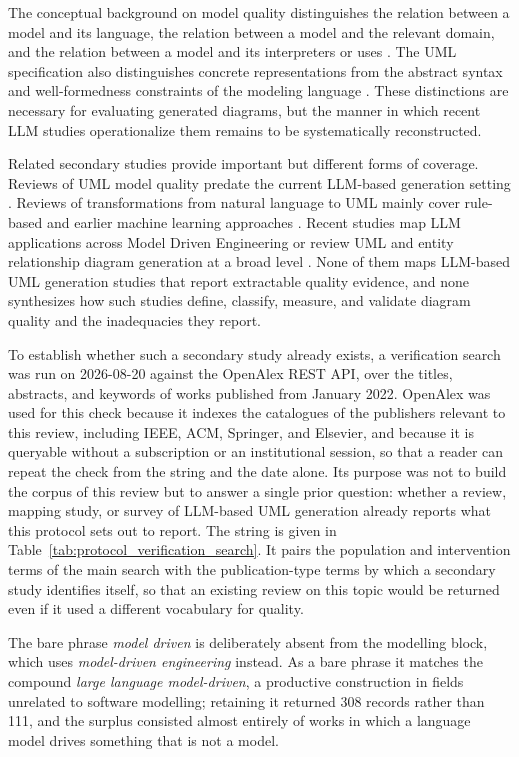 The conceptual background on model quality distinguishes the relation between a model and its language, the relation between a model and the relevant domain, and the relation between a model and its interpreters or uses \cite{Lindland1994Quality,Krogstie2006Process}. The UML specification also distinguishes concrete representations from the abstract syntax and well-formedness constraints of the modeling language \cite{OMG2017UML}. These distinctions are necessary for evaluating generated diagrams, but the manner in which recent LLM studies operationalize them remains to be systematically reconstructed.

Related secondary studies provide important but different forms of coverage. Reviews of UML model quality predate the current LLM-based generation setting \cite{Genero2011UMLQuality}. Reviews of transformations from natural language to UML mainly cover rule-based and earlier machine learning approaches \cite{Ahmed2022NaturalUML}. Recent studies map LLM applications across Model Driven Engineering or review UML and entity relationship diagram generation at a broad level \cite{Zhang2027LLMMDE,Rahmanian2026Diagrams}. None of them maps LLM-based UML generation studies that report extractable quality evidence, and none synthesizes how such studies define, classify, measure, and validate diagram quality and the inadequacies they report.

To establish whether such a secondary study already exists, a verification search was run on 2026-08-20 against the OpenAlex REST API, over the titles, abstracts, and keywords of works published from January 2022. OpenAlex was used for this check because it indexes the catalogues of the publishers relevant to this review, including IEEE, ACM, Springer, and Elsevier, and because it is queryable without a subscription or an institutional session, so that a reader can repeat the check from the string and the date alone. Its purpose was not to build the corpus of this review but to answer a single prior question: whether a review, mapping study, or survey of LLM-based UML generation already reports what this protocol sets out to report. The string is given in Table~\ref{tab:protocol_verification_search}. It pairs the population and intervention terms of the main search with the publication-type terms by which a secondary study identifies itself, so that an existing review on this topic would be returned even if it used a different vocabulary for quality.

The bare phrase \textit{model driven} is deliberately absent from the modelling block, which uses \textit{model-driven engineering} instead. As a bare phrase it matches the compound \textit{large language model-driven}, a productive construction in fields unrelated to software modelling; retaining it returned 308 records rather than 111, and the surplus consisted almost entirely of works in which a language model drives something that is not a model.

